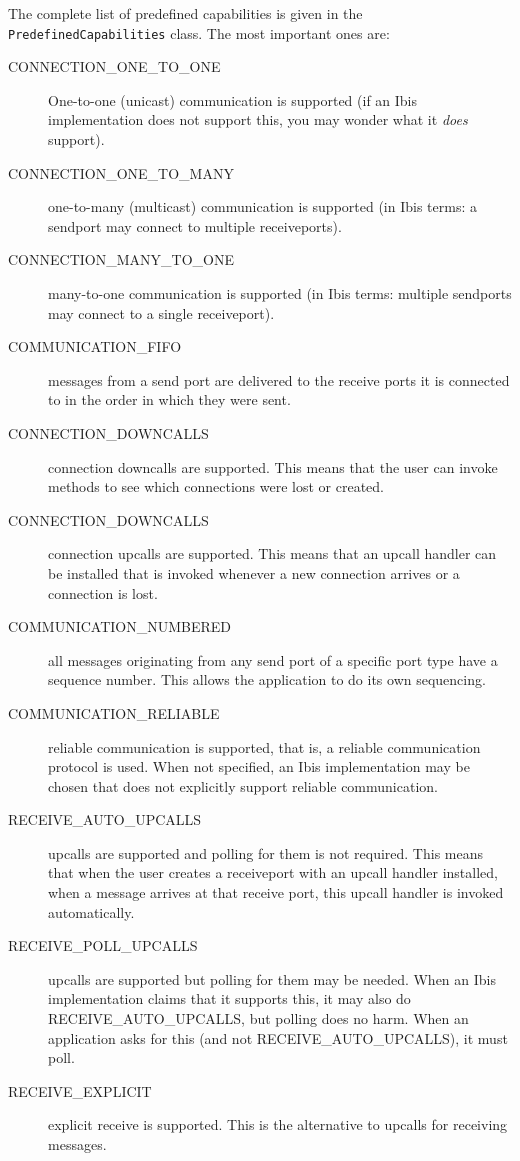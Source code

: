 \documentclass[10pt]{article}
\begin{document}
The complete list of predefined capabilities is given in the
\texttt{PredefinedCapabilities} class. The most important ones
are:
\begin{description}
\item[CONNECTION_ONE_TO_ONE]
One-to-one (unicast) communication is supported (if an Ibis implementation
does not support this, you may wonder what it \emph{does} support).
\item[CONNECTION_ONE_TO_MANY]
one-to-many (multicast) communication is supported
(in Ibis terms: a sendport
may connect to multiple receiveports).
\item[CONNECTION_MANY_TO_ONE]
many-to-one communication is supported (in Ibis terms: multiple
sendports may connect to a single receiveport).
\item[COMMUNICATION_FIFO]
messages from a send port are delivered to the receive ports it is
connected to in the order in which they were sent.
\item[CONNECTION_DOWNCALLS]
connection downcalls are supported. This means that the user can
invoke methods to see which connections were lost or created.
\item[CONNECTION_DOWNCALLS]
connection upcalls are supported. This means that an upcall
handler can be installed that is invoked whenever a new connection arrives
or a connection is lost.
\item[COMMUNICATION_NUMBERED]
all messages originating from any send port of a specific port type have
a sequence number. This allows the application to do its own sequencing.
\item[COMMUNICATION_RELIABLE]
reliable communication is supported, that is,
a reliable communication protocol is used.
When not specified, an Ibis implementation may be chosen that does not explicitly
support reliable communication.
\item[RECEIVE_AUTO_UPCALLS]
upcalls are supported and polling for them is not required.
This means that when the user creates a receiveport with an upcall
handler installed, when a message arrives at that receive port, 
this upcall handler is invoked automatically.
\item[RECEIVE_POLL_UPCALLS]
upcalls are supported but polling for them may be needed. When an
Ibis implementation claims that it supports this, it may also do
RECEIVE_AUTO_UPCALLS, but polling does no harm. When an application asks for
this (and not RECEIVE_AUTO_UPCALLS), it must poll.
\item[RECEIVE_EXPLICIT]
explicit receive is supported.
This is the alternative to upcalls for receiving messages.

\end{description}
\end{document}
